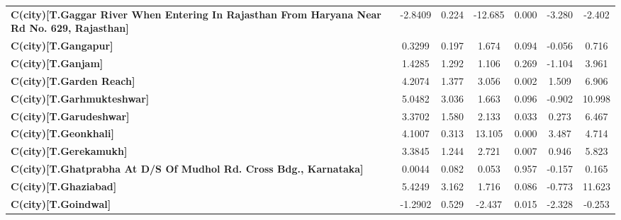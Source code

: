 \begin{center}
\begin{tabular}{lcccccc}
\textbf{C(city)[T.Gaggar River When Entering In Rajasthan From Haryana Near Rd No. 629, Rajasthan]} &      -2.8409  &        0.224     &   -12.685  &         0.000        &       -3.280    &       -2.402     \\
\textbf{C(city)[T.Gangapur]}                                                                        &       0.3299  &        0.197     &     1.674  &         0.094        &       -0.056    &        0.716     \\
\textbf{C(city)[T.Ganjam]}                                                                          &       1.4285  &        1.292     &     1.106  &         0.269        &       -1.104    &        3.961     \\
\textbf{C(city)[T.Garden Reach]}                                                                    &       4.2074  &        1.377     &     3.056  &         0.002        &        1.509    &        6.906     \\
\textbf{C(city)[T.Garhmukteshwar]}                                                                  &       5.0482  &        3.036     &     1.663  &         0.096        &       -0.902    &       10.998     \\
\textbf{C(city)[T.Garudeshwar]}                                                                     &       3.3702  &        1.580     &     2.133  &         0.033        &        0.273    &        6.467     \\
\textbf{C(city)[T.Geonkhali]}                                                                       &       4.1007  &        0.313     &    13.105  &         0.000        &        3.487    &        4.714     \\
\textbf{C(city)[T.Gerekamukh]}                                                                      &       3.3845  &        1.244     &     2.721  &         0.007        &        0.946    &        5.823     \\
\textbf{C(city)[T.Ghatprabha At D/S Of Mudhol Rd. Cross Bdg., Karnataka]}                           &       0.0044  &        0.082     &     0.053  &         0.957        &       -0.157    &        0.165     \\
\textbf{C(city)[T.Ghaziabad]}                                                                       &       5.4249  &        3.162     &     1.716  &         0.086        &       -0.773    &       11.623     \\
\textbf{C(city)[T.Goindwal]}                                                                        &      -1.2902  &        0.529     &    -2.437  &         0.015        &       -2.328    &       -0.253     \\

\end{tabular}
\end{center}
